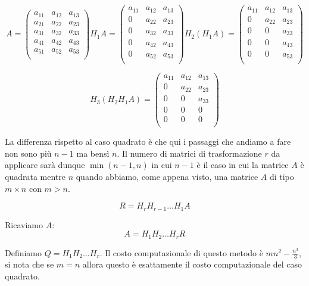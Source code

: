 \documentclass[12pt, a4paper]{book}
\theoremstyle{definition}
\begin{document}
\begin{flushleft}
\[
	A = 
	\begin{pmatrix}
		a_{11} & a_{12} & a_{13} \\
		a_{21} & a_{22} & a_{23} \\
		a_{31} & a_{32} & a_{33} \\
		a_{41} & a_{42} & a_{43} \\
		a_{51} & a_{52} & a_{53} \\
	\end{pmatrix}
	H_{1}A =
	\begin{pmatrix}
		a_{11} & a_{12} & a_{13} \\
		0 & a_{22} & a_{23} \\
		0 & a_{32} & a_{33} \\
		0 & a_{42} & a_{43} \\
		0 & a_{52} & a_{53} \\
	\end{pmatrix}
	H_{2}(H_{1}A) =
	\begin{pmatrix}
		a_{11} & a_{12} & a_{13} \\
		0 & a_{22} & a_{23} \\
		0 & 0 & a_{33} \\
		0 & 0 & a_{43} \\
		0 & 0 & a_{53} \\
	\end{pmatrix}
\]

\[ 
H_{3}(H_{2}H_{1}A) =
	\begin{pmatrix}
		a_{11} & a_{12} & a_{13} \\
		0 & a_{22} & a_{23} \\
		0 & 0 & a_{33} \\
		0 & 0 & 0 \\
		0 & 0 & 0 \\
	\end{pmatrix}
\]

La differenza rispetto al caso quadrato è che qui i passaggi che andiamo a fare non sono più $n - 1$ ma bensì $n$.
Il numero di matrici di trasformazione $r$ da applicare sarà dunque $ \min(n-1, n) $ in cui $n-1$ è il caso in cui la matrice $A$ è quadrata mentre $n$ quando abbiamo, come appena visto, una matrice $A$ di tipo $m \times n$ con $m > n$.

\[	
	R = H_{r}H_{r-1} \dots H_{1}A
\]

Ricaviamo $A$:
\[ 
	A = H_{1}H_{2} \dots H_{r}R
\]

Definiamo $Q = H_{1}H_{2} \dots H_{r} $.
Il costo computazionale di questo metodo è $mn^{2} - \frac{n^{3}}{3}$, si nota che se $m = n$ allora questo è esattamente il costo computazionale del caso quadrato.
\end{flushleft}
\end{document}
